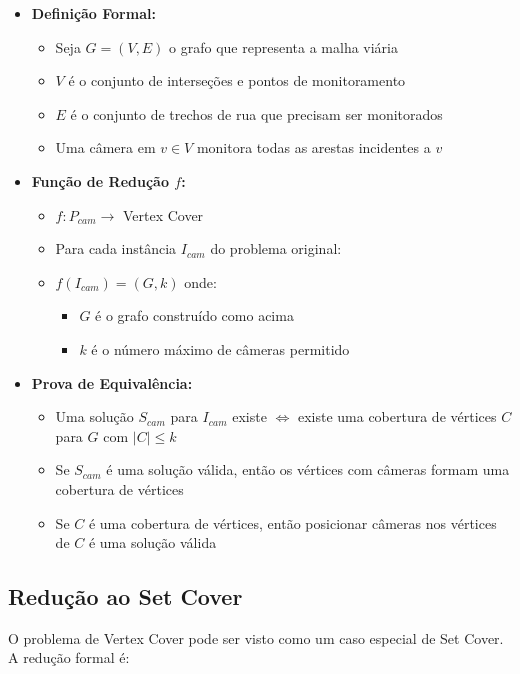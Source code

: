 \documentclass[12pt, a4paper]{report}
\begin{document}
\begin{itemize}
    \item \textbf{Definição Formal:}
    \begin{itemize}
        \item Seja $G = (V, E)$ o grafo que representa a malha viária
        \item $V$ é o conjunto de interseções e pontos de monitoramento
        \item $E$ é o conjunto de trechos de rua que precisam ser monitorados
        \item Uma câmera em $v \in V$ monitora todas as arestas incidentes a $v$
    \end{itemize}
    
    \item \textbf{Função de Redução $f$:}
    \begin{itemize}
        \item $f: P_{cam} \rightarrow$ Vertex Cover
        \item Para cada instância $I_{cam}$ do problema original:
        \item $f(I_{cam}) = (G, k)$ onde:
            \begin{itemize}
                \item $G$ é o grafo construído como acima
                \item $k$ é o número máximo de câmeras permitido
            \end{itemize}
    \end{itemize}
    
    \item \textbf{Prova de Equivalência:}
    \begin{itemize}
        \item Uma solução $S_{cam}$ para $I_{cam}$ existe $\iff$ existe uma cobertura de vértices $C$ para $G$ com $|C| \leq k$
        \item Se $S_{cam}$ é uma solução válida, então os vértices com câmeras formam uma cobertura de vértices
        \item Se $C$ é uma cobertura de vértices, então posicionar câmeras nos vértices de $C$ é uma solução válida
    \end{itemize}
\end{itemize}

\subsection{Redução ao Set Cover}
O problema de Vertex Cover pode ser visto como um caso especial de Set Cover. A redução formal é:
\end{document}
